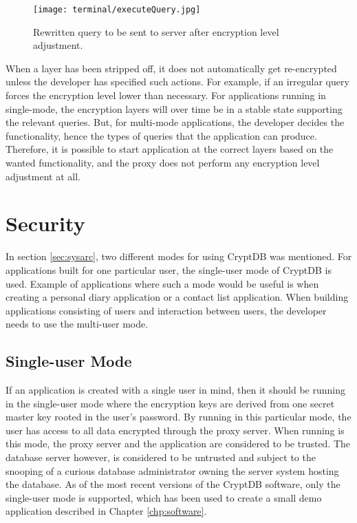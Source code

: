 \begin{figure}[h]
	\texttt{[image: terminal/executeQuery.jpg]}
	\caption{Rewritten query to be sent to server after encryption level adjustment.}
	\label{rewritten_query}
\end{figure}

When a layer has been stripped off, it does not automatically get re-encrypted unless the developer has specified such actions. For example, if an irregular query forces the encryption level lower than necessary. For applications running in single-mode, the encryption layers will over time be in a stable state supporting the relevant queries. But, for multi-mode applications, the developer decides the functionality, hence the types of queries that the application can produce. Therefore, it is possible to start application at the correct layers based on the wanted functionality, and the proxy does not perform any encryption level adjustment at all.



\section{Security}

In section \ref{sec:sysarc}, two different modes for using CryptDB was mentioned. For applications built for one particular user, the single-user mode of CryptDB is used. Example of applications where such a mode would be useful is when creating a personal diary application or a contact list application. When building applications consisting of users and interaction between users, the developer needs to use the multi-user mode.

\subsection{Single-user Mode}
If an application is created with a single user in mind, then it should be running in the single-user mode where the encryption keys are derived from one secret master key rooted in the user's password. By running in this particular mode, the user has access to all data encrypted through the proxy server. When running is this mode, the proxy server and the application are considered to be trusted. The database server however, is considered to be untrusted and subject to the snooping of a curious database administrator owning the server system hosting the database. As of the most recent versions of the CryptDB software, only the single-user mode is supported, which has been used to create a small demo application described in Chapter \ref{chp:software}.

